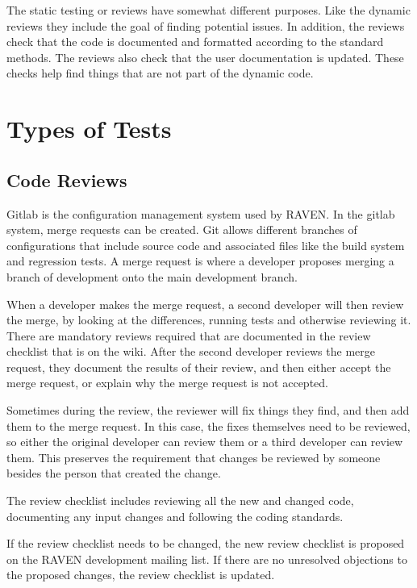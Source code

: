 \documentclass{article}
\begin{document}
The static testing or reviews have somewhat different purposes.  Like
the dynamic reviews they include the goal of finding potential
issues. In addition, the reviews check that the code is documented and
formatted according to the standard methods.  The reviews also check
that the user documentation is updated.  These checks help find things
that are not part of the dynamic code.

\section{Types of Tests}

\subsection{Code Reviews}

Gitlab is the configuration management system used by RAVEN. In the
gitlab system, merge requests can be created.  Git allows different
branches of configurations that include source code and associated
files like the build system and regression tests.  A merge request is
where a developer proposes merging a branch of development onto the
main development branch.

When a developer makes the merge request, a second developer will then
review the merge, by looking at the differences, running tests and
otherwise reviewing it.  There are mandatory reviews required that are
documented in the review checklist that is on the wiki.  After the
second developer reviews the merge request, they document the
results of their review, and then either accept the merge request, or
explain why the merge request is not accepted.

Sometimes during the review, the reviewer will fix things they find,
and then add them to the merge request.  In this case, the fixes
themselves need to be reviewed, so either the original developer can
review them or a third developer can review them.  This preserves the
requirement that changes be reviewed by someone besides the person
that created the change.

The review checklist includes reviewing all the new and changed code,
documenting any input changes and following the coding standards.

If the review checklist needs to be changed, the new review checklist
is proposed on the RAVEN development mailing list.  If there are no
unresolved objections to the proposed changes, the review checklist is
updated.
\end{document}
